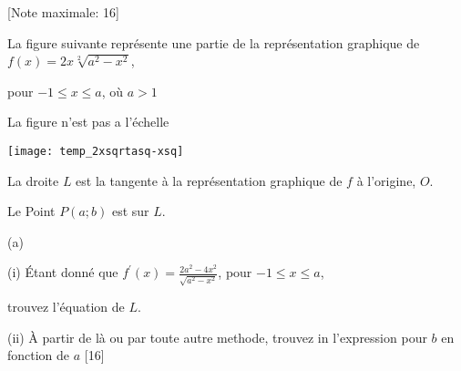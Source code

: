 \begin{question}
  \hspace*{\fill} [Note maximale: 16]\par
  \medskip
  \noindent La figure suivante représente une partie de la représentation graphique de $f(x) = 2x\sqrt[2]{a^2 - x^2}$,\par
  \noindent pour $-1 \le x \le a$, où $a > 1$\par
  \begin{center}
    \noindent La figure n'est pas a l'échelle\par
    \texttt{[image: temp\_2xsqrtasq-xsq]}\par
  \end{center}
  \medskip
  \noindent La droite $L$ est la tangente à la représentation graphique de $f$ à l'origine, $O$.\par
  \noindent Le Point $P(a; b)$ est sur $L$.\par
  \medskip
  (a)\par
  \hspace{1em}(i)  Étant donné que $f^\prime(x) =\frac{2a^2 - 4x^2}{\sqrt{a^2-x^2}}$, pour $-1 \le x \le a$,\par
  \hspace{2em} trouvez l'équation de $L$.\par
  \medskip
  \hspace{1em}(ii) À partir de là ou par toute autre methode, trouvez in l'expression pour $b$ en fonction de $a$\hspace*{\fill} [16]\par
  \medskip
\end{question}

